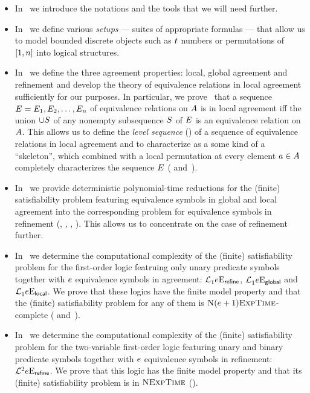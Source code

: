 \begin{itemize}
  \item
  In~ we introduce the notations and the tools that we will
  need further.
  
  \item
  In~ we define various \emph{setups} --- suites of appropriate
  formulas --- that allow us to model bounded discrete objects such as $t$
  numbers or permutations of $[1,n]$ into logical structures.

  \item
  In~ we define the three agreement properties:
  local, global agreement and refinement and develop the theory of equivalence relations
  in local agreement sufficiently for our purposes.
  In particular, we prove~ that a sequence $E =
  E_{1},E_{2},\dots,E_{n}$ of equivalence relations on $A$ is in
  local agreement iff the union $\cup S$ of any nonempty subsequence $S$
  of $E$ is an equivalence relation on $A$.
  This allows us to define the \emph{level sequence} () of a
  sequence of equivalence relations in local agreement and to characterize as a
  some kind of a ``skeleton'', which combined with a local permutation at every
  element $a\in A$ completely characterizes the sequence $E$
  ( and~).
  
  \item
  In~ we provide deterministic polynomial-time reductions
  for the (finite) satisfiability problem featuring equivalence symbols in
  global and local agreement into the corresponding problem for equivalence
  symbols in refinement (,
  , ,
  ).
  This allows us to concentrate on the case of refinement further.
  
  \item
  In~ we determine the computational complexity of the
  (finite) satisfiability problem for the first-order logic featruing only unary
  predicate symbols together with $e$ equivalence symbols in agreement:
  $\mathcal{L}^{{}}_{1}{e}\mathrm{E}_{\mathsf{refine}}$,
  $\mathcal{L}^{{}}_{1}{e}\mathrm{E}_{\mathsf{global}}$ and 
  $\mathcal{L}^{{}}_{1}{e}\mathrm{E}_{\mathsf{local}}$.
  We prove that these logics have the finite model property and that the
  (finite) satisfiability problem for any of them is
  $\text{\normalfont{\scshape N}}(e+1)\text{\normalfont{\scshape ExpTime}}$-complete (
  and~).
  
  \item
  In~ we determine the computational complexity of the (finite)
  satisfiability problem for the two-variable first-order logic featuring unary
  and binary predicate symbols together with $e$ equivalence symbols in
  refinement:
  $\mathcal{L}^{2}_{{}}{e}\mathrm{E}_{\mathsf{refine}}$.
  We prove that this logic has the finite model property and that its (finite)
  satisfiability problem is in $\text{\normalfont{\scshape NExpTime}}$ ().

\end{itemize}